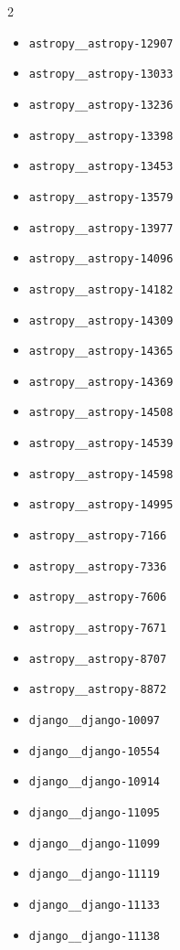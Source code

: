 \documentclass{article} %
\begin{document}
\begin{multicols}{2}
\begin{itemize}
    \item \texttt{astropy\_\_astropy-12907}
    \item \texttt{astropy\_\_astropy-13033}
    \item \texttt{astropy\_\_astropy-13236}
    \item \texttt{astropy\_\_astropy-13398}
    \item \texttt{astropy\_\_astropy-13453}
    \item \texttt{astropy\_\_astropy-13579}
    \item \texttt{astropy\_\_astropy-13977}
    \item \texttt{astropy\_\_astropy-14096}
    \item \texttt{astropy\_\_astropy-14182}
    \item \texttt{astropy\_\_astropy-14309}
    \item \texttt{astropy\_\_astropy-14365}
    \item \texttt{astropy\_\_astropy-14369}
    \item \texttt{astropy\_\_astropy-14508}
    \item \texttt{astropy\_\_astropy-14539}
    \item \texttt{astropy\_\_astropy-14598}
    \item \texttt{astropy\_\_astropy-14995}
    \item \texttt{astropy\_\_astropy-7166}
    \item \texttt{astropy\_\_astropy-7336}
    \item \texttt{astropy\_\_astropy-7606}
    \item \texttt{astropy\_\_astropy-7671}
    \item \texttt{astropy\_\_astropy-8707}
    \item \texttt{astropy\_\_astropy-8872}
    \item \texttt{django\_\_django-10097}
    \item \texttt{django\_\_django-10554}
    \item \texttt{django\_\_django-10914}
    \item \texttt{django\_\_django-11095}
    \item \texttt{django\_\_django-11099}
    \item \texttt{django\_\_django-11119}
    \item \texttt{django\_\_django-11133}
    \item \texttt{django\_\_django-11138}

\end{itemize}
\end{multicols}
\end{document}
